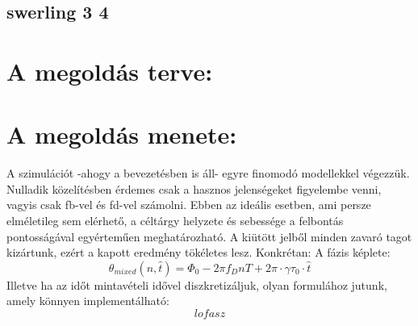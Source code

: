 \documentclass{article}
\begin{document}
    \subsection{swerling 3 4}
\section{A megoldás terve:}

\section{A megoldás menete:}
    A szimulációt -ahogy a bevezetésben is áll- egyre finomodó modellekkel végezzük. Nulladik közelítésben érdemes csak
    a hasznos jelenségeket figyelembe venni, vagyis csak fb-vel és fd-vel számolni. Ebben az ideális esetben, ami persze
    elméletileg sem elérhető, a céltárgy helyzete és sebessége a felbontás pontosságával egyérteműen meghatározható.
    A kiütött jelből minden zavaró tagot kizártunk, ezért a kapott eredmény tökéletes lesz. \newline
    Konkrétan: A fázis képlete:
        \begin{equation}
            \theta_{mixed}(n, \hat{t})=\Phi_0-2 \pi f_D nT+2 \pi \cdot \gamma \tau_0\cdot \hat{t}
            \label{theta_mixed_discrete}
        \end{equation}
    Illetve ha az időt mintavételi idővel diszkretizáljuk, olyan formulához
    jutunk, amely könnyen implementálható:
        \begin{equation}
            lofasz
        \end{equation}
\end{document}
